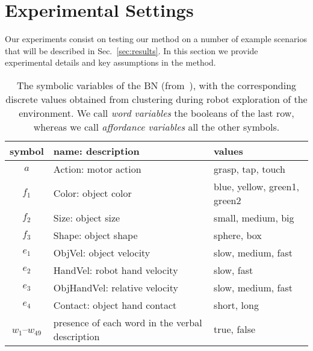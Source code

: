 
\section{Experimental Settings}
\label{sec:experimental_settings}
Our experiments consist on testing our method on a number of example scenarios that will be described in Sec.~\ref{sec:results}.
In this section we provide experimental details and key assumptions in the method.

\begin{table}
    \centering
    \caption{The symbolic variables of the \acl{BN} (from~\cite{salvi:2012:smcb}), with the corresponding discrete values obtained from clustering during robot exploration of the environment.
    We call \emph{word variables} the booleans of the last row, whereas we call \emph{affordance variables} all the other symbols.}
    \label{tab:bnsymb}
    \begin{tabular}{cp{3.3cm}l}
    \toprule
    symbol & name: description     & values \\
    \midrule
    $a$    & Action: motor action  & grasp, tap, touch \\
    \midrule
    $f_1$  & Color: object color   & blue, yellow, green1, green2 \\
    $f_2$  & Size: object size     & small, medium, big \\
    $f_3$  & Shape: object shape   & sphere, box \\ %
    \midrule
    $e_1$  & ObjVel: object velocity                     & slow, medium, fast \\
    $e_2$  & HandVel: robot hand velocity                & slow, fast \\
    $e_3$  & ObjHandVel: relative \objecthand{} velocity & slow, medium, fast \\
    $e_4$  & Contact: object hand contact                & short, long \\
    \midrule
    $w_1$--$w_{49}$ & presence of each word in the verbal description & true, false \\
    \bottomrule
    \end{tabular}
\end{table}

